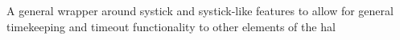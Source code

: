 A general wrapper around systick and systick-\/like features to allow for general timekeeping and timeout functionality to other elements of the hal 